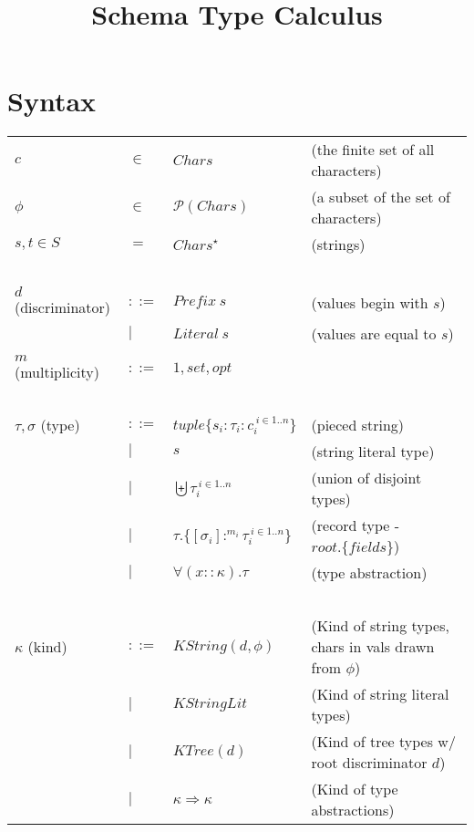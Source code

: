 \documentclass{article}
\title{Schema Type Calculus}
\begin{document}
\maketitle

\section*{Syntax}

\begin{tabular}{llll}
$c$ & $\in$ & $\mathit{Chars}$ & (the finite set of all characters) \\
$\phi$ & $\in$ & $\mathcal P(\mathit{Chars})$ & (a subset of the set of characters) \\
$s,t \in S$ & $=$ & $\mathit{Chars}^{\star}$ & (strings) \\~\\
$d$ (discriminator) & $::=$  & $\mathit{Prefix}~s$ & (values begin with $s$) \\
    & $\mid$ & $\mathit{Literal}~s$ & (values are equal to $s$) \\
 & & \\
$m$ (multiplicity) & $::=$ & $1,\mathit{set},\mathit{opt}$\\~\\
$\tau,\sigma$ (type) & $::=$ & $\mathit{tuple} \{ s_i : \tau_i : c_i^{~i \in 1..n} \}$ & (pieced string) \\
       & $\mid$ & $s$ & (string literal type) \\
       & $\mid$ & $\biguplus \tau_i^{~i \in 1..n}$ & (union of disjoint types) \\ 
       & $\mid$ & $\tau.\{[\sigma_i] :^{m_i} \tau_i ^{~i \in 1..n}\}$ & (record type - $\mathit{root}.\{ fields \}$) \\ 
       & $\mid$ & $\forall (x :: \kappa). \tau$ & (type abstraction) \\~\\
$\kappa$ (kind) & $::=$ & $\mathit{KString}(d,\phi)$ & (Kind of string types, chars in vals drawn from $\phi$) \\
                         & $\mid$ & $\mathit{KStringLit}$ & (Kind of string literal types) \\
                         & $\mid$ & $\mathit{KTree}(d)$ & (Kind of tree types w/ root discriminator $d$) \\
                         & $\mid$ & $\kappa \Rightarrow \kappa$ & (Kind of type abstractions) \\
\end{tabular}\\~\\~\\
\begin{tabular}{llll}

\end{tabular}
\end{document}
